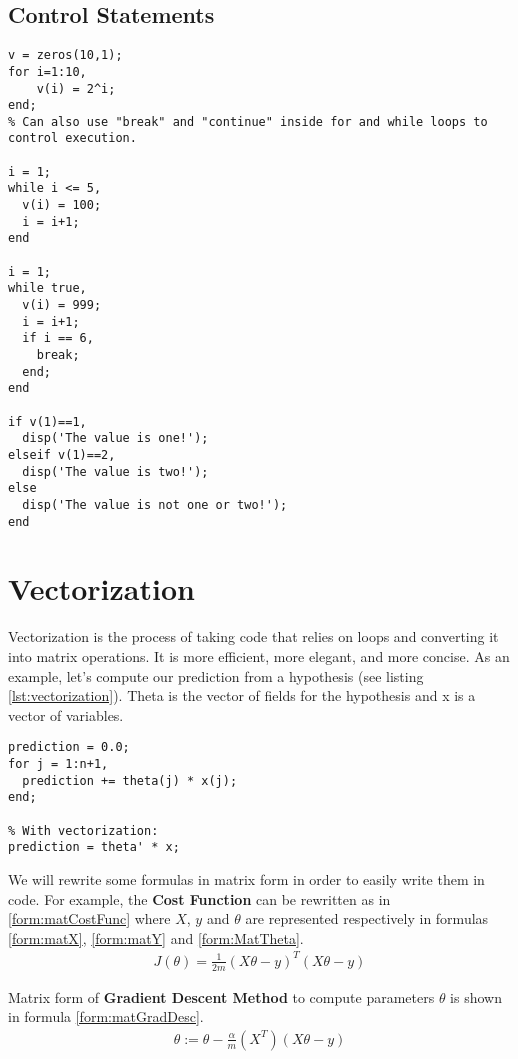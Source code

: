 \subsection{Control Statements}
\begin{lstlisting}[label=lst:ctrlState, caption=Control Statements in Octave]
v = zeros(10,1);
for i=1:10, 
    v(i) = 2^i;
end;
% Can also use "break" and "continue" inside for and while loops to control execution.

i = 1;
while i <= 5,
  v(i) = 100; 
  i = i+1;
end

i = 1;
while true, 
  v(i) = 999; 
  i = i+1;
  if i == 6,
    break;
  end;
end

if v(1)==1,
  disp('The value is one!');
elseif v(1)==2,
  disp('The value is two!');
else
  disp('The value is not one or two!');
end
\end{lstlisting}

\section{Vectorization}
Vectorization is the process of taking code that relies on loops and converting it into matrix operations. It is more efficient, more elegant, and more concise.
As an example, let's compute our prediction from a hypothesis (see listing \ref{lst:vectorization}). Theta is the vector of fields for the hypothesis and x is a vector of variables.
\begin{lstlisting}[label=lst:vectorization, caption=Vectorization Example]
% With loops:
prediction = 0.0;
for j = 1:n+1,
  prediction += theta(j) * x(j);
end;

% With vectorization:
prediction = theta' * x;
\end{lstlisting}
We will rewrite some formulas in matrix form in order to easily write them in code. For example, the \textbf{Cost Function} can be rewritten as in \eqref{form:matCostFunc} where $X$, $y$ and $\theta$ are represented respectively in formulas \eqref{form:matX}, \eqref{form:matY} and \eqref{form:MatTheta}.
\begin{align} \label{form:matCostFunc}
J(\theta) = \frac{1}{2m} (X\theta - y)^T(X\theta - y)
\end{align}

Matrix form of \textbf{Gradient Descent Method} to compute parameters $\theta$ is shown in formula \eqref{form:matGradDesc}.
\begin{align} \label{form:matGradDesc}
\theta := \theta - \frac{\alpha}{m}(X^T)(X\theta - y)
\end{align}
